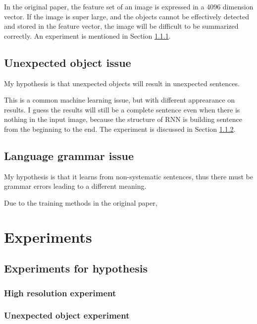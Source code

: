 \documentclass[10pt,twocolumn,letterpaper]{article}
\begin{document}
In the original paper, the feature set of an image is expressed in a 4096 dimension vector.
If the image is super large, and the objects cannot be effectively detected and stored in the feature vector,
the image will be difficult to be summarized correctly. An experiment is mentioned in Section \ref{sec:hs}.


\subsection{Unexpected object issue}
My hypothesis is that unexpected objects will result in unexpected sentences.

This is a common machine learning issue, but with different apprearance on results.
I guess the results will still be a complete sentence even when there is nothing in the input image,
because the structure of RNN is building sentence from the beginning to the end.
The experiment is discussed in Section \ref{sec:uo}.


\subsection{Language grammar issue}
My hypothesis is that it learns from non-systematic sentences, thus there must be grammar errors leading to a different meaning.

Due to the training methods in the original paper,



\section{Experiments}



\subsection{Experiments for hypothesis}
\subsubsection{High resolution experiment} \label{sec:hs}

\subsubsection{Unexpected object experiment} \label{sec:uo}
\end{document}
